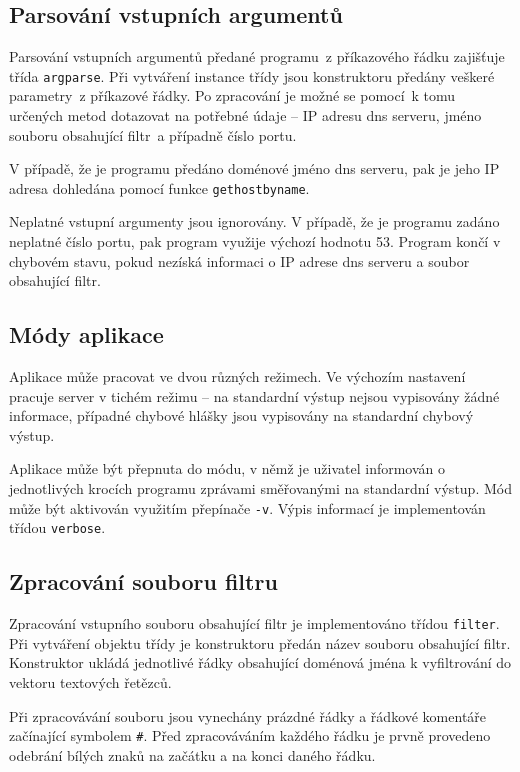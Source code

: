 \documentclass[a4paper, 11pt]{article}
\begin{document}
	\subsection{Parsování vstupních argumentů}
	Parsování vstupních argumentů předané programu~z příkazového řádku zajišťuje třída \texttt{argparse}. Při vytváření instance třídy jsou konstruktoru předány veškeré parametry~z příkazové řádky. Po zpracování je možné se pomocí~k tomu určených metod dotazovat na potřebné údaje -- IP adresu dns serveru, jméno souboru obsahující filtr~a případně číslo portu. 
	
	V případě, že je programu předáno doménové jméno dns serveru, pak je jeho IP adresa dohledána pomocí funkce \texttt{gethostbyname}. 
	
	Neplatné vstupní argumenty jsou ignorovány. V případě, že je programu zadáno neplatné číslo portu, pak program využije výchozí hodnotu 53. Program končí v chybovém stavu, pokud nezíská informaci o IP adrese dns serveru a soubor obsahující filtr. 
	
	\subsection{Módy aplikace}
	Aplikace může pracovat ve dvou různých režimech. Ve výchozím nastavení pracuje server v tichém režimu -- na standardní výstup nejsou vypisovány žádné informace, případné chybové hlášky jsou vypisovány na standardní chybový výstup. 
	
	Aplikace může být přepnuta do módu, v němž je uživatel informován o jednotlivých krocích programu zprávami směřovanými na standardní výstup. Mód může být aktivován využitím přepínače \texttt{-v}. Výpis informací je implementován třídou \texttt{verbose}.

	\subsection{Zpracování souboru filtru}
	Zpracování vstupního souboru obsahující filtr je implementováno třídou \texttt{filter}. Při vytváření objektu třídy je konstruktoru předán název souboru obsahující filtr. Konstruktor ukládá jednotlivé řádky obsahující doménová jména k vyfiltrování do vektoru textových řetězců. 
	
	Při zpracovávání souboru jsou vynechány prázdné řádky a řádkové komentáře začínající symbolem \texttt{\#}. Před zpracováváním každého řádku je prvně provedeno odebrání bílých znaků na začátku a na konci daného řádku.
	
\end{document}

